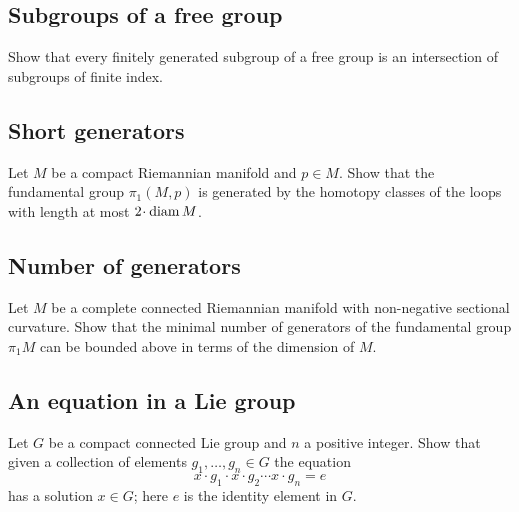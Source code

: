 \subsection*{Subgroups of a free group}\label{Subgroups of free group} 

\begin{pr}
Show that every finitely generated subgroup of a free group 
is an intersection of subgroups of finite index.
\end{pr}

\subsection*{Short generators\easy}\label{Lengths of generators of the fundamental group}

\begin{pr}
Let $M$ be a compact Riemannian manifold and $p\in M$.
Show that the fundamental group $\pi_1(M,p)$
is generated by the homotopy classes of the loops with length at most $2\cdot\diam M$.
\end{pr}

\subsection*{Number of generators}\label{Number of generators}

\begin{pr}
Let $M$ be a complete connected Riemannian manifold with non-negative sectional curvature.
Show that the minimal number of generators of the fundamental group $\pi_1 M$
can be bounded above in terms of the dimension of $M$.
\end{pr}


\subsection*{An equation in a Lie group\easy}\label{Equations in the group}

\begin{pr}
Let $G$ be a compact connected Lie group and $n$ a positive integer.
Show that given a collection of elements $g_1,\ldots,g_n\in G$
the equation 
\[x\cdot g_1\cdot x\cdot g_2\cdots x\cdot g_n=e\]
has a solution $x\in G$;
here $e$ is the identity element in $G$.
\end{pr}

